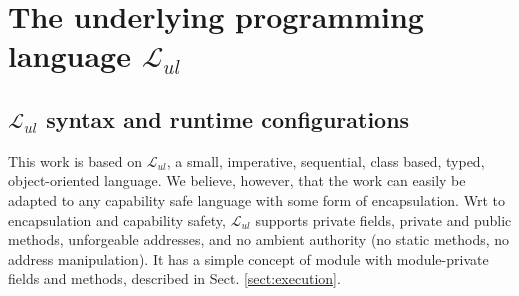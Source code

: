 \renewcommand{\LangOO}{\ensuremath{{\mathcal{L}}_{ul}}\xspace }

\section{The underlying programming language \LangOO}  
\label{sect:underlying}

\subsection{\LangOO syntax and runtime configurations}
\label{sub:Loo} 
{This work} is based on \LangOO, a {small}, imperative, sequential,  class based, typed, object-oriented language. 
 {We believe, however, that the work can easily be adapted to any capability safe language with some form of encapsulation. 
Wrt to encapsulation and  capability safety},  \LangOO supports private fields, private and public methods, unforgeable addresses, and no ambient authority (no static methods, no address manipulation).
 It has a simple concept of module with module-private fields and methods, described in Sect. \ref{sect:execution}.

